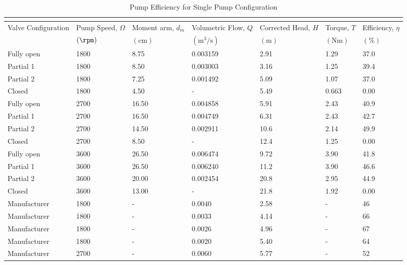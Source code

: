 \begin{longtable}{lC{0.10\textwidth}C{0.10\textwidth}C{0.10\textwidth}C{0.10\textwidth}C{0.10\textwidth}C{0.10\textwidth}}
    \caption{Pump Efficiency for Single Pump Configuration} \\
    \label{tab:pump_efficiency} \\[-8ex]
    \toprule
    Valve Configuration & Pump Speed, $\Omega$ & Moment arm, $d_m$ & Volumetric Flow, $Q$ & Corrected Head, $H$ & Torque, $T$ & Efficiency, $\eta$ \\
    & $(\unit{\rpm})$ & $(\unit{\centi\meter})$ & $(\unit{\meter\cubed\per\second})$ & $(\unit{\meter})$ & $(\unit{\newton\meter})$ & $(\unit{\percent})$ \\
    \midrule
    Fully open & 1800 & 8.75 & 0.003159 & 2.91 & 1.29 & 37.0 \\
    Partial 1 & 1800 & 8.50 & 0.003003 & 3.16 & 1.25 & 39.4 \\
    Partial 2 & 1800 & 7.25 & 0.001492 & 5.09 & 1.07 & 37.0 \\
    Closed & 1800 & 4.50 & - & 5.49 & 0.663 & 0.00 \\
    Fully open & 2700 & 16.50 & 0.004858 & 5.91 & 2.43 & 40.9 \\
    Partial 1 & 2700 & 16.50 & 0.004749 & 6.31 & 2.43 & 42.7 \\
    Partial 2 & 2700 & 14.50 & 0.002911 & 10.6 & 2.14 & 49.9 \\
    Closed & 2700 & 8.50 & - & 12.4 & 1.25 & 0.00 \\
    Fully open & 3600 & 26.50 & 0.006474 & 9.72 & 3.90 & 41.8 \\
    Partial 1 & 3600 & 26.50 & 0.006240 & 11.2 & 3.90 & 46.6 \\
    Partial 2 & 3600 & 20.00 & 0.002454 & 20.8 & 2.95 & 44.9 \\
    Closed & 3600 & 13.00 & - & 21.8 & 1.92 & 0.00 \\
    Manufacturer & 1800 & - & 0.0040 & 2.58 & - & 46 \\
    Manufacturer & 1800 & - & 0.0033 & 4.14 & - & 66 \\
    Manufacturer & 1800 & - & 0.0026 & 4.96 & - & 67 \\
    Manufacturer & 1800 & - & 0.0020 & 5.40 & - & 64 \\
    Manufacturer & 2700 & - & 0.0060 & 5.77 & - & 52 \\

\end{longtable}
